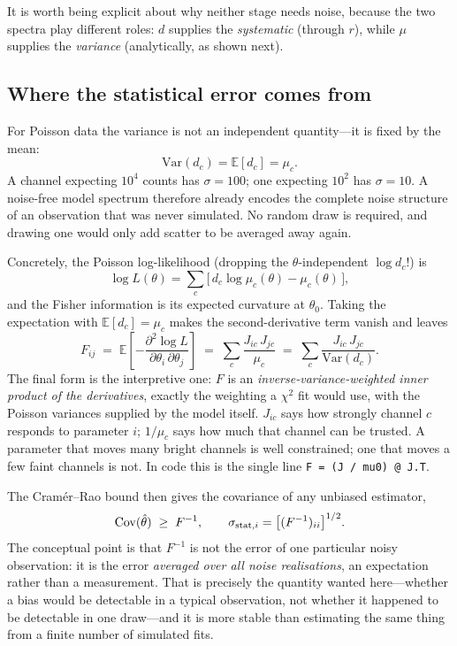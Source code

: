 \documentclass[11pt,a4paper]{article}
\newcommand{\code}[1]{\texttt{#1}}
\begin{document}
It is worth being explicit about why neither stage needs noise, because the two
spectra play different roles: $d$ supplies the \emph{systematic} (through $r$),
while $\mu$ supplies the \emph{variance} (analytically, as shown next).

\subsection{Where the statistical error comes from}
For Poisson data the variance is not an independent quantity---it is fixed by
the mean:
\begin{equation}
\mathrm{Var}(d_c) = \mathbb{E}[d_c] = \mu_c .
\end{equation}
A channel expecting $10^4$ counts has $\sigma=100$; one expecting $10^2$ has
$\sigma=10$. A noise-free model spectrum therefore already encodes the complete
noise structure of an observation that was never simulated. No random draw is
required, and drawing one would only add scatter to be averaged away again.

Concretely, the Poisson log-likelihood (dropping the $\theta$-independent
$\log d_c!$) is
\begin{equation}
\log L(\theta) = \sum_c \big[\, d_c \log\mu_c(\theta) - \mu_c(\theta) \,\big],
\end{equation}
and the Fisher information is its expected curvature at $\theta_0$. Taking the
expectation with $\mathbb{E}[d_c]=\mu_c$ makes the second-derivative term vanish
and leaves
\begin{equation}
F_{ij} \;=\; \mathbb{E}\!\left[-\frac{\partial^2 \log L}
{\partial\theta_i\,\partial\theta_j}\right]
\;=\; \sum_c \frac{J_{ic}\,J_{jc}}{\mu_c}
\;=\; \sum_c \frac{J_{ic}\,J_{jc}}{\mathrm{Var}(d_c)} .
\label{eq:fisher}
\end{equation}
The final form is the interpretive one: $F$ is an
\emph{inverse-variance-weighted inner product of the derivatives}, exactly the
weighting a $\chi^2$ fit would use, with the Poisson variances supplied by the
model itself. $J_{ic}$ says how strongly channel $c$ responds to parameter $i$;
$1/\mu_c$ says how much that channel can be trusted. A parameter that moves many
bright channels is well constrained; one that moves a few faint channels is not.
In code this is the single line \code{F = (J / mu0) @ J.T}.

The Cram\'er--Rao bound then gives the covariance of any unbiased estimator,
\begin{equation}
\mathrm{Cov}(\hat\theta) \;\ge\; F^{-1},
\qquad
\sigma_{{\rm stat},i} = \big[(F^{-1})_{ii}\big]^{1/2}.
\end{equation}
The conceptual point is that $F^{-1}$ is not the error of one particular noisy
observation: it is the error \emph{averaged over all noise realisations}, an
expectation rather than a measurement. That is precisely the quantity wanted
here---whether a bias would be detectable in a typical observation, not whether
it happened to be detectable in one draw---and it is more stable than estimating
the same thing from a finite number of simulated fits.
\end{document}
